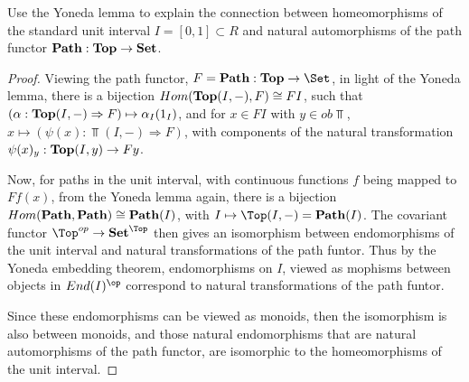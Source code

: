\documentclass[main.tex]{subfiles}
\begin{document}
\begin{lemma}[2.2.vii]

Use the Yoneda lemma to explain the connection between homeomorphisms of the
standard unit interval $I = [0,1] \subset R$ and natural automorphisms of the
path functor $\bold {Path} : \bold {Top} \rightarrow \bold {Set}$.

\end{lemma}

\begin{proof}
Viewing the path functor, $F = \bold {Path}: \bold{Top} \rightarrow
\Set$, in light of the Yoneda lemma, there is a bijection $Hom(
\bold{Top} (I,-),F) \cong FI$, such that $(\alpha : \bold{Top} (I,-)
\Rightarrow F) \mapsto \alpha_I (1_I)$, and for $x \in FI$ with $y \in ob
\Top$, $x \mapsto (\psi (x) : \Top(I,-) \Rightarrow F)$, with
components of the natural transformation $\psi(x)_y : \bold{Top} (I,y)
\rightarrow Fy$. 

Now, for paths in the unit interval, with continuous functions $f$ being mapped
to $Ff(x)$, from the Yoneda lemma again, there is a bijection $Hom(\bold{Path},
\bold{Path}) \cong \bold{Path} (I)$, with $I \mapsto \Top(I,-) =
\bold{Path} (I)$. The covariant functor $\Top^{op} \rightarrow
\bold{Set}^{\Top}$ then gives an isomorphism between endomorphisms of the
unit interval and natural transformations of the path funtor. Thus by the
Yoneda embedding theorem, endomorphisms on $I$, viewed as mophisms between
objects in $End(I)^{\op}$ correspond to natural transformations of the path
funtor. 

Since these endomorphisms can be viewed as monoids, then the isomorphism is also between monoids, and those natural endomorphisms that are natural automorphisms of the path functor, are isomorphic to the homeomorphisms of the unit interval.


\end{proof}	
	
	
\end{document}
